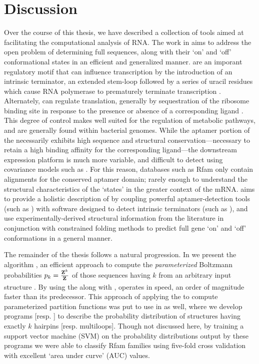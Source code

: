 
\chapter{Discussion}
\label{ch:disc}


Over the course of this thesis, we have described a collection of tools aimed
at facilitating the computational analysis of RNA. The work in 
aims to address the open problem of determining full \rb sequences, along
with their `on' and `off' conformational states in an efficient and generalized
manner. \Rbs are an imporant regulatory motif that can influence
transcription by the introduction of an intrinsic terminator, an extended stem-loop
followed by a series of uracil residues which cause RNA polymerase to prematurely
terminate transcription \citep{gusarov:1999uu,yarnell:1999wt}. Alternately,
\rbs can regulate translation, generally by sequestration of the ribosome
binding site in response to the presence or absence of a corresponding ligand
\citep{barrick:2007gw}. This degree of control makes \rbs well suited for
the regulation of metabolic pathways, and are generally found within bacterial
genomes. While the aptamer portion of the \rb necessarily exhibits high
sequence and structural conservation---necessary to retain a high binding affinity
for the corresponding ligand---the downstream expression platform is much more
variable, and difficult to detect using covariance models such as \infernal
\citep{infernal}. For this reason, databases such as Rfam \citep{nawrocki:2014uy}
only contain alignments for the conserved aptamer domain; rarely enough to
understand the structural characteristics of the \rb `states' in the greater
context of the mRNA. \rfinder aims to provide a holistic description of
\rbs by coupling powerful aptamer-detection tools (such as \infernal) with software
designed to detect intrinsic terminators (such as \tthp), and use
experimentally-derived structural information from the literature in conjunction
with constrained folding methods to predict full gene `on' and `off' conformations
in a general manner.

The remainder of the thesis follows a natural progression. In  we
present the algorithm \fftbor, an efficient approach to compute the
{\em parameterized} Boltzmann probabilities $p_k = \frac{{\bf Z}^{k}_{}}{{\bf Z}^{}_{}}$ of
those sequences having \bpd $k$ from an arbitrary input structure
\strSt. By using the \fft along with \nRoUs, \fftbor operates in  speed,
an order of magnitude faster than its predecessor. This approach of applying the
\fft to compute parameterized partition functions was put to use in
\citep{ding:2014ex} as well, where we develop programs 
[resp. ] to describe the probability distribution of structures
having exactly $k$ hairpins [resp. multiloops]. Though not discussed here, by
training a support vector machine (SVM) on the probability distributions output
by these
programs we were able to classify Rfam families using five-fold cross validation
with excellent `area under curve' (AUC) values.

